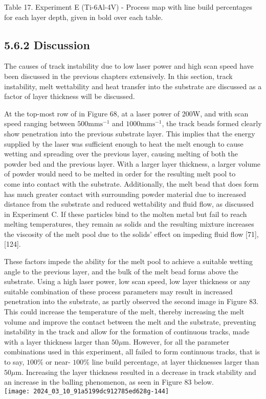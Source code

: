\documentclass[10pt]{article}
\begin{document}
Table 17. Experiment E (Ti-6Al-4V) - Process map with line build percentages for each layer depth, given in bold over each table.

\subsection*{5.6.2 Discussion}
The causes of track instability due to low laser power and high scan speed have been discussed in the previous chapters extensively. In this section, track instability, melt wettability and heat transfer into the substrate are discussed as a factor of layer thickness will be discussed.

At the top-most row of in Figure 68, at a laser power of 200W, and with scan speed ranging between $500 \mathrm{mms}^{-1}$ and $1000 \mathrm{mms}^{-1}$, the track beads formed clearly show penetration into the previous substrate layer. This implies that the energy supplied by the laser was sufficient enough to heat the melt enough to cause wetting and spreading over the previous layer, causing melting of both the powder bed and the previous layer. With a larger layer thickness, a larger volume of powder would need to be melted in order for the resulting melt pool to\\
come into contact with the substrate. Additionally, the melt bead that does form has much greater contact with surrounding powder material due to increased distance from the substrate and reduced wettability and fluid flow, as discussed in Experiment $\mathrm{C}$. If these particles bind to the molten metal but fail to reach melting temperatures, they remain as solids and the resulting mixture increases the viscosity of the melt pool due to the solids' effect on impeding fluid flow [71], [124].

These factors impede the ability for the melt pool to achieve a suitable wetting angle to the previous layer, and the bulk of the melt bead forms above the substrate. Using a high laser power, low scan speed, low layer thickness or any suitable combination of these process parameters may result in increased penetration into the substrate, as partly observed the second image in Figure 83. This could increase the temperature of the melt, thereby increasing the melt volume and improve the contact between the melt and the substrate, preventing instability in the track and allow for the formation of continuous tracks, made with a layer thickness larger than $50 \mu \mathrm{m}$. However, for all the parameter combinations used in this experiment, all failed to form continuous tracks, that is to say, $100 \%$ or near- $100 \%$ line build percentage, at layer thicknesses larger than $50 \mu \mathrm{m}$. Increasing the layer thickness resulted in a decrease in track stability and an increase in the balling phenomenon, as seen in Figure 83 below.\\
\texttt{[image: 2024\_03\_10\_91a5199dc912785ed628g-144]}
\end{document}

